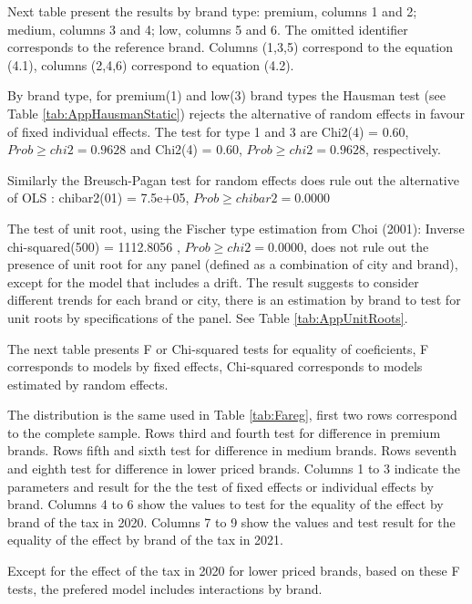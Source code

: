 \documentclass[]{article}
\begin{document}


Next table present the results by brand type: premium, columns 1 and 2; medium, columns 3 and 4; low, columns 5 and 6. The omitted identifier corresponds to the reference brand. Columns (1,3,5) correspond to the equation (4.1), columns (2,4,6) correspond to equation (4.2). 



By brand type, for premium(1) and low(3) brand types the Hausman test (see  Table \ref{tab:AppHausmanStatic}) rejects the alternative of random effects in favour of fixed individual effects. The test for type 1 and 3 are Chi2(4) =  0.60,
$Prob \geq chi2 =    0.9628$ and Chi2(4) =  0.60,
$Prob \geq chi2 =    0.9628$, respectively. 

Similarly the Breusch-Pagan test for random effects does rule out the alternative of OLS : chibar2(01) =  7.5e+05,
$Prob \geq chibar2 =    0.0000$

The test of unit root, using the Fischer type estimation from Choi (2001): 
Inverse chi-squared(500) = 1112.8056 , $Prob \geq chi2 =    0.0000$, does not rule out the presence of unit root for any panel (defined as a combination of city and brand), except for the model that includes a drift. The result suggests to consider different trends for each brand or city, there is an estimation by brand to test for unit roots by specifications of the panel. See Table \ref{tab:AppUnitRoots}.

The next table presents F or Chi-squared tests for equality of coeficients, F corresponds to models by fixed effects, Chi-squared corresponds to models estimated by random effects.

The distribution is the same used in Table \ref{tab:Fareg}, first two rows correspond to the complete sample. Rows third and fourth test for difference in premium brands. Rows fifth and sixth test for difference in medium brands. Rows seventh and eighth test for difference in lower priced brands.
Columns 1 to 3 indicate the parameters and result for the the test of fixed effects or individual effects by brand. Columns 4 to 6 show the values to test for the equality of the effect by brand of the tax in 2020. Columns 7 to 9 show the values and test result for the equality of the effect by brand of the tax in 2021.

Except for the effect of the tax in 2020 for lower priced brands, based on these F tests, the prefered model includes interactions by brand.
\end{document}
